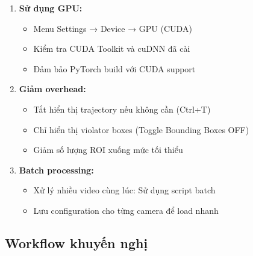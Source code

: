 \begin{enumerate}
    \item \textbf{Sử dụng GPU:}
    \begin{itemize}
        \item Menu Settings → Device → GPU (CUDA)
        \item Kiểm tra CUDA Toolkit và cuDNN đã cài
        \item Đảm bảo PyTorch build với CUDA support
    \end{itemize}
    
    \item \textbf{Giảm overhead:}
    \begin{itemize}
        \item Tắt hiển thị trajectory nếu không cần (Ctrl+T)
        \item Chỉ hiển thị violator boxes (Toggle Bounding Boxes OFF)
        \item Giảm số lượng ROI xuống mức tối thiểu
    \end{itemize}
    
    \item \textbf{Batch processing:}
    \begin{itemize}
        \item Xử lý nhiều video cùng lúc: Sử dụng script batch
        \item Lưu configuration cho từng camera để load nhanh
    \end{itemize}
\end{enumerate}

\subsection{Workflow khuyến nghị}

